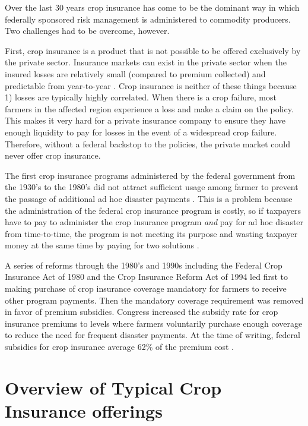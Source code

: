 \documentclass[
]{book}
\begin{document}
Over the last 30 years crop insurance has come to be the dominant way in which federally sponsored risk management is administered to commodity producers. Two challenges had to be overcome, however.

First, crop insurance is a product that is not possible to be offered exclusively by the private sector. Insurance markets can exist in the private sector when the insured losses are relatively small (compared to premium collected) and predictable from year-to-year \citep{babcock_crop_2006}. Crop insurance is neither of these things because 1) losses are typically highly correlated. When there is a crop failure, most farmers in the affected region experience a loss and make a claim on the policy. This makes it very hard for a private insurance company to ensure they have enough liquidity to pay for losses in the event of a widespread crop failure. Therefore, without a federal backstop to the policies, the private market could never offer crop insurance.

The first crop insurance programs administered by the federal government from the 1930's to the 1980's did not attract sufficient usage among farmer to prevent the passage of additional ad hoc disaster payments \citep{glauber_growth_2013}. This is a problem because the administration of the federal crop insurance program is costly, so if taxpayers have to pay to administer the crop insurance program \emph{and} pay for ad hoc disaster from time-to-time, the program is not meeting its purpose and wasting taxpayer money at the same time by paying for two solutions \citep{babcock_crop_2006}.

A series of reforms through the 1980's and 1990s including the Federal Crop Insurance Act of 1980 and the Crop Insurance Reform Act of 1994 led first to making purchase of crop insurance coverage mandatory for farmers to receive other program payments. Then the mandatory coverage requirement was removed in favor of premium subsidies. Congress increased the subsidy rate for crop insurance premiums to levels where farmers voluntarily purchase enough coverage to reduce the need for frequent disaster payments. At the time of writing, federal subsidies for crop insurance average 62\% of the premium cost \citep{zulauf_crop_2016}.

\hypertarget{overview-of-typical-crop-insurance-offerings}{%
\section{Overview of Typical Crop Insurance offerings}\label{overview-of-typical-crop-insurance-offerings}}
\end{document}
